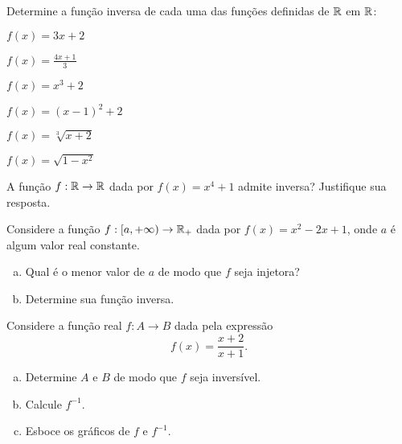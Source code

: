\begin{secExercicios}
\begin{exer}
    Determine a função inversa de cada uma das funções definidas de $\mathbb{R}$ em $\mathbb{R}$:
    \begin{enumerate}[a)]
        \begin{multicols}{2}
            \item $f(x)=3x+2$
            \item $f(x)=\frac{4x+1}{3}$
            \item $f(x)=x^3+2$
            \item $f(x)=(x-1)^2+2$
            \item $f(x)=\sqrt[3]{x+2}$
            \item $f(x)=\sqrt{1-x^2}$
        \end{multicols}
    \end{enumerate}
\end{exer}

\begin{exer}
    A função $f:\mathbb{R}\to\mathbb{R}$ dada por $f(x)=x^4+1$ admite inversa? Justifique sua resposta.
\end{exer}

\begin{exer}
    Considere a função $f:[a,+\infty)\to\mathbb{R}_+$ dada por $f(x)=x^2-2x+1$, onde $a$ é algum valor real constante.
    \begin{enumerate}[a)]
        \item Qual é o menor valor de $a$ de modo que $f$ seja injetora?
        \item Determine sua função inversa.
    \end{enumerate}
\end{exer}

\begin{exer}
    Considere a função real $f:A\to B$ dada pela expressão
    \begin{equation*}
        f(x)=\dfrac{x+2}{x+1}.
    \end{equation*}
    \begin{enumerate}[a)]
        \item Determine $A$ e $B$ de modo que $f$ seja inversível.
        \item Calcule $f^{-1}$.
        \item Esboce os gráficos de $f$ e $f^{-1}$.
    \end{enumerate}
\end{exer}
\end{secExercicios}



